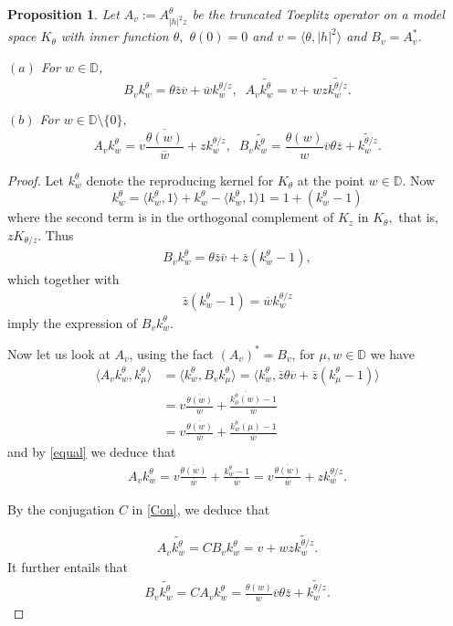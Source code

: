 \documentclass[10pt,a4paper]{amsart}
\newtheorem{prop}{Proposition}
\newcommand{\la}{\langle}
\newcommand{\ol}{\overline}
\newcommand{\ra}{\rangle}
\begin{document}
\begin{prop}\label{prop ker} Let $A_v:=A_{|h|^2z}^\theta$ be the truncated Toeplitz operator on
a model space $K_\theta$ with  inner function $\theta,$ $\theta(0)=0$ and $v=\la \theta, |h|^2\ra$ and $B_v=A_v^*$.

 $(a)$ For $w\in \mathbb{D}$,
$$B_v k_{w}^\theta=
\theta\bar{z}\ol{v} +\ol{w}k_{w}^{\theta/z},\;\; A_v \widetilde{k_{w}^\theta}= v+ w z\widetilde{k_{w}^{\theta/z}}.$$

$(b)$ For $w\in \mathbb{D}\setminus\{0\},$ $$ A_v k_{w}^\theta =v   \frac{\ol{\theta(w)} }{\ol{w}} +zk_{w}^{\theta/z},\;\;
B_v \widetilde{k_{w}^\theta} =\frac{\theta(w)}{w}\ol{v}\theta\ol{z}+\widetilde{k_w^{\theta/z}}.$$
\end{prop}

\begin{proof}

Let $k_w^\theta$ denote the reproducing kernel for $K_\theta$ at the point $w\in \mathbb{D}$. Now $$k_w^\theta=\la k_w^\theta, 1\ra+k_w^\theta-\la k_w^\theta, 1\ra 1=1+(k_w^\theta-1)$$ where the second term is in the orthogonal complement of $K_z$ in $K_\theta,$ that is, $zK_{\theta/z}.$ Thus \begin{align*} B_vk_w^\theta=\theta\bar{z}\ol{v}+
\bar{z}(k_w^\theta-1),\end{align*} which together with
\begin{align}\bar{z}(k_w^\theta-1) = \ol{w}k_{w}^{\theta/z}\label{equal}\end{align} imply the expression of $B_vk_w^\theta.$

Now let us look at $A_v$, using the fact $(A_v)^*=B_v$, for $\mu, w\in \mathbb{D}$ we have
\begin{align*} \la A_v k_w^\theta, k_\mu^\theta\ra&= \la k_w^\theta, B_vk_\mu^\theta\ra= \la k_w^\theta, \bar{z}\theta\ol{v}+\bar{z}(k_\mu^\theta-1)\ra \\&=v\frac{\ol{\theta(w)}}{\ol{w}}+ \frac{\ol{k_\mu^\theta(w)}-1}{\ol{w}}\\&= v\frac{\ol{\theta(w)}}{\ol{w}}+\frac{k_w^\theta(\mu)-1}
{\ol{w}} \end{align*}
and  by \eqref{equal} we deduce that \begin{align*}A_v k_w^\theta= v \frac{\ol{\theta(w)}}{\ol{w}}+\frac{k_w^\theta-1}
{\ol{w}}=v\frac{\ol{\theta(w)}}{\ol{w}}+zk_w^{\theta/z}. \end{align*}

By the conjugation $C$ in \eqref{Con}, we deduce that

\begin{align*}A_v \widetilde{k_w^\theta}=C B_vk_w^\theta=v+wz\widetilde{k_w^{\theta/z}}. \end{align*}
It further entails that
\begin{align*} B_v\widetilde{k_w^\theta}=C A_v k_w^\theta=\frac{\theta(w)}{w}\ol{v}\theta \bar{z}+\widetilde{k_w^{\theta/z}}. \end{align*}
\end{proof}
\end{document}

